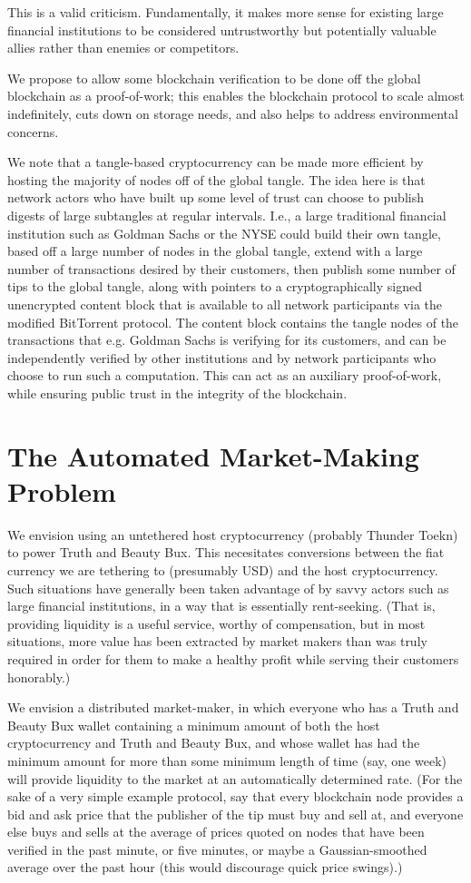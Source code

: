 \documentclass{article}
\begin{document}
This is a valid criticism. Fundamentally, it makes more sense for
existing large financial institutions to be considered untrustworthy
but potentially valuable allies rather than enemies or competitors.

We propose to allow some blockchain verification to be done off the
global blockchain as a proof-of-work; this enables the blockchain
protocol to scale almost indefinitely, cuts down on storage needs, and
also helps to address environmental concerns.

We note that a tangle-based cryptocurrency can be made more efficient
by hosting the majority of nodes off of the global tangle. The idea
here is that network actors who have built up some level of trust can
choose to publish digests of large subtangles at regular
intervals. I.e., a large traditional financial institution such as
Goldman Sachs or the NYSE could build their own tangle, based off a
large number of nodes in the global tangle, extend with a large number
of transactions desired by their customers, then publish some number
of tips to the global tangle, along with pointers to a
cryptographically signed unencrypted content block that is available
to all network participants via the modified BitTorrent protocol. The
content block contains the tangle nodes of the transactions that
e.g. Goldman Sachs is verifying for its customers, and can be
independently verified by other institutions and by network
participants who choose to run such a computation. This can act as an
auxiliary proof-of-work, while ensuring public trust in the integrity
of the blockchain.

\section{The Automated Market-Making Problem}

We envision using an untethered host cryptocurrency (probably Thunder
Toekn) to power Truth and Beauty Bux. This necesitates conversions
between the fiat currency we are tethering to (presumably USD) and the
host cryptocurrency. Such situations have generally been taken
advantage of by savvy actors such as large financial institutions, in
a way that is essentially rent-seeking. (That is, providing liquidity
is a useful service, worthy of compensation, but in most situations,
more value has been extracted by market makers than was truly required
in order for them to make a healthy profit while serving their
customers honorably.)

We envision a distributed market-maker, in which everyone who has a
Truth and Beauty Bux wallet containing a minimum amount of both the
host cryptocurrency and Truth and Beauty Bux, and whose wallet has had
the minimum amount for more than some minimum length of time (say, one
week) will provide liquidity to the market at an automatically
determined rate. (For the sake of a very simple example protocol, say
that every blockchain node provides a bid and ask price that the
publisher of the tip must buy and sell at, and everyone else buys and
sells at the average of prices quoted on nodes that have been verified
in the past minute, or five minutes, or maybe a Gaussian-smoothed
average over the past hour (this would discourage quick price
swings).)
\end{document}
